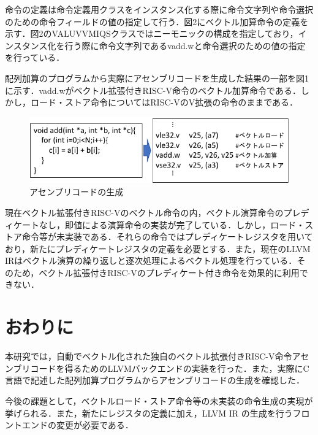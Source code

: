 ﻿\documentclass[a4j]{jarticle}
\begin{document}

命令の定義は命令定義用クラスをインスタンス化する際に命令文字列や命令選択のための命令フィールドの値の指定して行う．図2にベクトル加算命令の定義を示す．図2のVALUVVMIQSクラスではニーモニックの構成を指定しており，インスタンス化を行う際に命令文字列であるvadd.wと命令選択のための値の指定を行っている．

配列加算のプログラムから実際にアセンブリコードを生成した結果の一部を図1に示す．vadd.wがベクトル拡張付きRISC-V命令のベクトル加算命令である．しかし，ロード・ストア命令についてはRISC-VのV拡張の命令のままである．

\begin{figure}[tb]
    \centering
    \vspace{1truemm}
    \includegraphics[scale=0.8]{miqs_assembly_yokou.pdf}
    \caption{アセンブリコードの生成}
    \label{fig:assembly}
\end{figure}

現在ベクトル拡張付きRISC-Vのベクトル命令の内，ベクトル演算命令のプレディケートなし，即値による演算命令の実装が完了している．しかし，ロード・ストア命令等が未実装である．それらの命令ではプレディケートレジスタを用いており，新たにプレディケートレジスタの定義を必要とする．また，現在のLLVM IRはベクトル演算の繰り返しと逐次処理によるベクトル処理を行っている．そのため，ベクトル拡張付きRISC-Vのプレディケート付き命令を効果的に利用できない．

\section{おわりに}
本研究では，自動でベクトル化された独自のベクトル拡張付きRISC-V命令アセンブリコードを得るためのLLVMバックエンドの実装を行った．また，実際にC言語で記述した配列加算プログラムからアセンブリコードの生成を確認した．

今後の課題として，ベクトルロード・ストア命令等の未実装の命令生成の実現が挙げられる．また，新たにレジスタの定義に加え，LLVM IR の生成を行うフロントエンドの変更が必要である．
\end{document}
